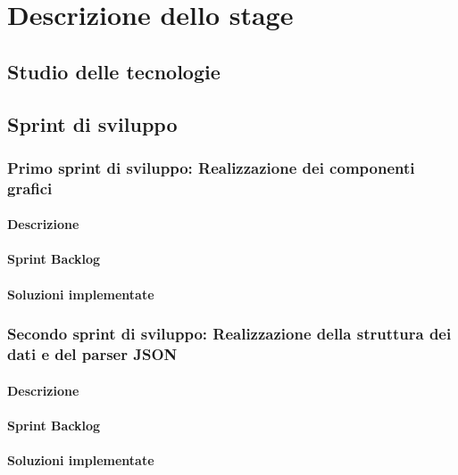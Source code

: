 
\chapter{Descrizione dello stage}
\label{cap:descrizione-stage}

\section{Studio delle tecnologie}

\section{Sprint di sviluppo}

\subsection{Primo sprint di sviluppo: Realizzazione dei componenti grafici}
\subsubsection*{Descrizione}
\subsubsection*{Sprint Backlog}
\subsubsection*{Soluzioni implementate}

\subsection{Secondo sprint di sviluppo: Realizzazione della struttura dei dati e del parser JSON}
\subsubsection*{Descrizione}
\subsubsection*{Sprint Backlog}
\subsubsection*{Soluzioni implementate}

